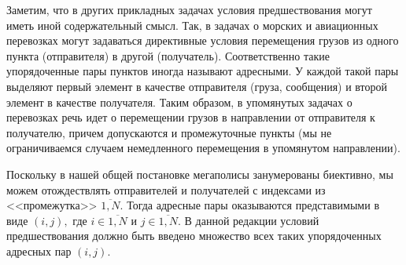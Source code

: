 \documentclass[11pt,twoside,openany]{report}
\newcommand{\ov}{\overline}
\begin{document}
Заметим, что в других прикладных задачах условия предшествования могут иметь
иной содержательный смысл. Так, в задачах о морских и авиационных перевозках
могут задаваться директивные условия перемещения грузов из одного пункта
(отправителя) в другой (получатель). Соответственно такие упорядоченные пары
пунктов иногда называют адресными. У каждой такой пары выделяют первый элемент
в качестве отправителя (груза, сообщения) и второй элемент в качестве получателя.
Таким образом, в упомянутых задачах о перевозках речь идет о перемещении грузов в
направлении от отправителя к получателю, причем допускаются и промежуточные пункты
(мы не ограничиваемся случаем немедленного перемещения в упомянутом направлении).

Поскольку в нашей общей постановке мегаполисы занумерованы биективно, мы можем
отождествлять отправителей и получателей с индексами из <<промежутка>> $\ov{1,N}.$
Тогда адресные пары оказываются представимыми в виде $(i,j),$ где $i\in \ov{1,N}$
и $j\in \ov{1,N}.$ В данной редакции условий предшествования должно быть введено
множество всех таких упорядоченных адресных пар $(i,j).$
\end{document}
